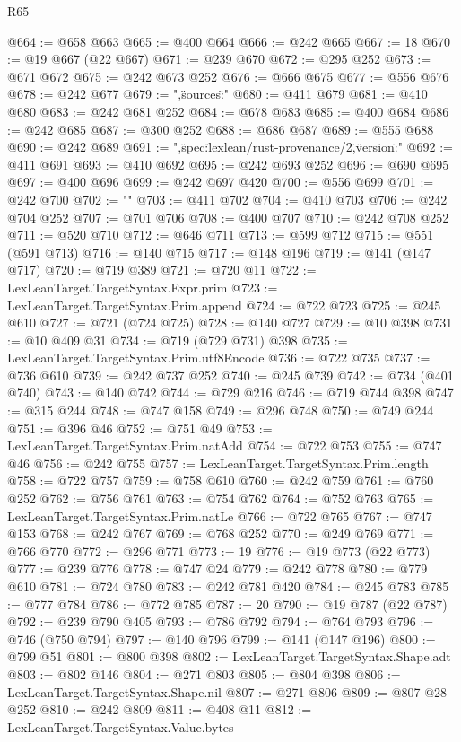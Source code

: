 \begin{lexlean}{R65}
\begin{coremodule}
{@664 := @658 @663
@665 := @400 @664
@666 := @242 @665
@667 := 18
@670 := @19 @667 (@22 @667)
@671 := @239 @670
@672 := @295 @252
@673 := @671 @672
@675 := @242 @673 @252
@676 := @666 @675
@677 := @556 @676
@678 := @242 @677
@679 := ",\"sources\":"
@680 := @411 @679
@681 := @410 @680
@683 := @242 @681 @252
@684 := @678 @683
@685 := @400 @684
@686 := @242 @685
@687 := @300 @252
@688 := @686 @687
@689 := @555 @688
@690 := @242 @689
@691 := ",\"spec\":\"lexlean/rust-provenance/2\",\"version\":"
@692 := @411 @691
@693 := @410 @692
@695 := @242 @693 @252
@696 := @690 @695
@697 := @400 @696
@699 := @242 @697 @420
@700 := @556 @699
@701 := @242 @700
@702 := "}\n"
@703 := @411 @702
@704 := @410 @703
@706 := @242 @704 @252
@707 := @701 @706
@708 := @400 @707
@710 := @242 @708 @252
@711 := @520 @710
@712 := @646 @711
@713 := @599 @712
@715 := @551 (@591 @713)
@716 := @140 @715
@717 := @148 @196
@719 := @141 (@147 @717)
@720 := @719 @389
@721 := @720 @11
@722 := LexLeanTarget.TargetSyntax.Expr.prim
@723 := LexLeanTarget.TargetSyntax.Prim.append
@724 := @722 @723
@725 := @245 @610
@727 := @721 (@724 @725)
@728 := @140 @727
@729 := @10 @398
@731 := @10 @409 @31
@734 := @719 (@729 @731) @398
@735 := LexLeanTarget.TargetSyntax.Prim.utf8Encode
@736 := @722 @735
@737 := @736 @610
@739 := @242 @737 @252
@740 := @245 @739
@742 := @734 (@401 @740)
@743 := @140 @742
@744 := @729 @216
@746 := @719 @744 @398
@747 := @315 @244
@748 := @747 @158
@749 := @296 @748
@750 := @749 @244
@751 := @396 @46
@752 := @751 @49
@753 := LexLeanTarget.TargetSyntax.Prim.natAdd
@754 := @722 @753
@755 := @747 @46
@756 := @242 @755
@757 := LexLeanTarget.TargetSyntax.Prim.length
@758 := @722 @757
@759 := @758 @610
@760 := @242 @759
@761 := @760 @252
@762 := @756 @761
@763 := @754 @762
@764 := @752 @763
@765 := LexLeanTarget.TargetSyntax.Prim.natLe
@766 := @722 @765
@767 := @747 @153
@768 := @242 @767
@769 := @768 @252
@770 := @249 @769
@771 := @766 @770
@772 := @296 @771
@773 := 19
@776 := @19 @773 (@22 @773)
@777 := @239 @776
@778 := @747 @24
@779 := @242 @778
@780 := @779 @610
@781 := @724 @780
@783 := @242 @781 @420
@784 := @245 @783
@785 := @777 @784
@786 := @772 @785
@787 := 20
@790 := @19 @787 (@22 @787)
@792 := @239 @790 @405
@793 := @786 @792
@794 := @764 @793
@796 := @746 (@750 @794)
@797 := @140 @796
@799 := @141 (@147 @196)
@800 := @799 @51
@801 := @800 @398
@802 := LexLeanTarget.TargetSyntax.Shape.adt
@803 := @802 @146
@804 := @271 @803
@805 := @804 @398
@806 := LexLeanTarget.TargetSyntax.Shape.nil
@807 := @271 @806
@809 := @807 @28 @252
@810 := @242 @809
@811 := @408 @11
@812 := LexLeanTarget.TargetSyntax.Value.bytes

\end{coremodule}
\end{lexlean}
